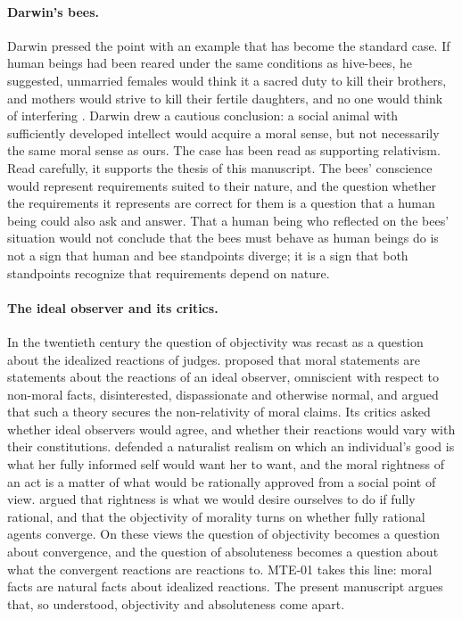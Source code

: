 \documentclass{situationist-preprint}
\begin{document}
\paragraph{Darwin's bees.} Darwin pressed the point with an example that has become the standard case. If human beings had been reared under the same conditions as hive-bees, he suggested, unmarried females would think it a sacred duty to kill their brothers, and mothers would strive to kill their fertile daughters, and no one would think of interfering \citep{Darwin1871}. Darwin drew a cautious conclusion: a social animal with sufficiently developed intellect would acquire a moral sense, but not necessarily the same moral sense as ours. The case has been read as supporting relativism. Read carefully, it supports the thesis of this manuscript. The bees' conscience would represent requirements suited to their nature, and the question whether the requirements it represents are correct for them is a question that a human being could also ask and answer. That a human being who reflected on the bees' situation would not conclude that the bees must behave as human beings do is not a sign that human and bee standpoints diverge; it is a sign that both standpoints recognize that requirements depend on nature.

\paragraph{The ideal observer and its critics.} In the twentieth century the question of objectivity was recast as a question about the idealized reactions of judges. \citet{Firth1952} proposed that moral statements are statements about the reactions of an ideal observer, omniscient with respect to non-moral facts, disinterested, dispassionate and otherwise normal, and argued that such a theory secures the non-relativity of moral claims. Its critics asked whether ideal observers would agree, and whether their reactions would vary with their constitutions. \citet{Railton1986} defended a naturalist realism on which an individual's good is what her fully informed self would want her to want, and the moral rightness of an act is a matter of what would be rationally approved from a social point of view. \citet{Smith1994} argued that rightness is what we would desire ourselves to do if fully rational, and that the objectivity of morality turns on whether fully rational agents converge. On these views the question of objectivity becomes a question about convergence, and the question of absoluteness becomes a question about what the convergent reactions are reactions to. MTE-01 takes this line: moral facts are natural facts about idealized reactions. The present manuscript argues that, so understood, objectivity and absoluteness come apart.
\end{document}
